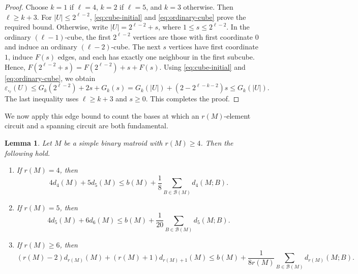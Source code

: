\documentclass[10pt,a4paper]{article}
\numberwithin{equation}{section}
\newtheorem{lemma}[lemma]{Lemma}
\newcommand{\BB}{\mathcal B}
\newcommand{\dloc}[1]{d_{#1}(M;B)}
\begin{document}
\begin{proof}
Choose \(k=1\) if \(\ell=4\), \(k=2\) if \(\ell=5\), and
\(k=3\) otherwise. Then \(\ell\ge k+3\).
For \(|U|\le2^{\ell-2}\), \eqref{eq:cube-initial} and
\eqref{eq:ordinary-cube} prove the required bound.
Otherwise, write \(|U|=2^{\ell-2}+s\), where \(1\le s\le2^{\ell-2}\).
In the ordinary \((\ell-1)\)-cube, the first \(2^{\ell-2}\) vertices
are those with first coordinate \(0\) and induce an ordinary \((\ell-2)\)-cube.
The next \(s\) vertices have first coordinate \(1\), induce \(F(s)\) edges,
and each has exactly one neighbour in the first subcube. Hence,
\(F(2^{\ell-2}+s)=F(2^{\ell-2})+s+F(s)\).
Using \eqref{eq:cube-initial} and \eqref{eq:ordinary-cube}, we obtain
\[
\varepsilon_{\square_\ell}(U)\le G_k(2^{\ell-2})+2s+G_k(s)
=G_k(|U|)+(2-2^{\ell-k-2})s\le G_k(|U|).
\]
The last inequality uses \(\ell\ge k+3\) and \(s\ge0\).
This completes the proof.
\end{proof}


We now apply this edge bound to count the bases at which an
\(r(M)\)-element circuit and a spanning circuit are both fundamental.


\begin{lemma}\label{lem:cube-count}
Let \(M\) be a simple binary matroid with \(r(M)\ge4\).
Then the following hold.
\begin{enumerate}
\item[\(\mathrm{(i)}\)] If \(r(M)=4\), then
\[
 4d_4(M)+5d_5(M)
 \le b(M)+\frac18\sum_{B\in\BB(M)}\dloc4.
\]
\item[\(\mathrm{(ii)}\)] If \(r(M)=5\), then
\[
 4d_5(M)+6d_6(M)
 \le b(M)+\frac1{20}\sum_{B\in\BB(M)}\dloc5.
\]
\item[\(\mathrm{(iii)}\)] If \(r(M)\ge6\), then
\[
 (r(M)-2)d_{r(M)}(M)+(r(M)+1)d_{r(M)+1}(M)
 \le b(M)+\frac1{8r(M)}\sum_{B\in\BB(M)}\dloc{r(M)}.
\]
\end{enumerate}
\end{lemma}
\end{document}
